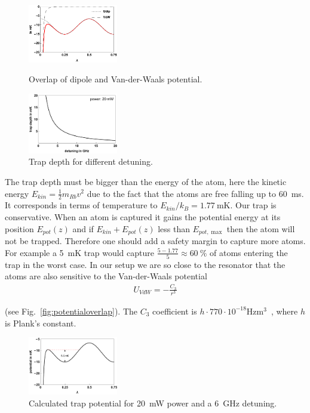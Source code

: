 \begin{figure}
    \includegraphics[width=0.35\textwidth]{potentialoverlap}    
    \caption{\label{fig:potentialoverlap} Overlap of dipole and Van-der-Waals potential.}
    \vspace{2em}
    \includegraphics[width=0.35\textwidth]{detuningopt}    
    \caption{\label{fig:detuningopt} Trap depth for different detuning.}
\end{figure}

The trap depth must be bigger than the energy of the atom, here the kinetic energy 
\(E_{kin} = \frac{1}{2}m_{Rb} v^2 \) due to the fact that the atoms are free 
falling up to \SI{60}{\milli\second}. It corresponds in terms
of temperature to \(E_{kin}/k_B = \SI{1.77}{\milli\kelvin} \). Our trap is 
conservative. When an atom is captured it gains the potential energy at its
position \(E_{pot}(z) \) and if \(E_{kin} + E_{pot}(z) \) less than \(E_{pot,\max}\) 
then the atom will not be trapped. Therefore one should add a safety margin to 
capture more atoms. For example a \SI{5}{\milli\kelvin} trap would capture 
\(\frac{5-1.77}{5} \approx \SI{60}{\percent} \) of atoms entering the trap in the 
worst case. In our setup we are so close to the resonator that the atoms are also 
sensitive to the Van-der-Waals potential\cite{PhysRevA.89.022511}
\begin{align}
    U_{VdW} = -\frac{C_3}{r^3}
\end{align} 

(see Fig.~\ref{fig:potentialoverlap}). The \(C_3\)
coefficient is \( h\cdot770\cdot10^{-18} \si{\hertz\meter\cubed}\)~\cite{OsheaPHD}, 
where \(h\) is Plank's constant.

\begin{figure}
    \includegraphics[width=0.35\textwidth]{trapdepth}    
    \caption{\label{fig:trapdepth} Calculated trap potential for \SI{20}{\milli\watt}
     power and a \SI{6}{\giga\hertz} detuning.}
\end{figure}

